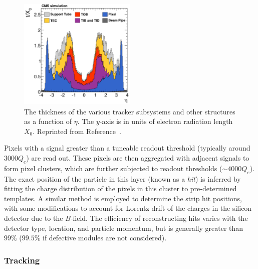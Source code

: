 \begin{figure}[]
    \begin{center} 
        \includegraphics[width=0.5\textwidth]{figures/cms/tracker_material.png}
        \caption{The thickness of the various tracker subsystems and other structures as a function of $\eta$.
				 The $y$-axis is in units of electron radiation length $X_0$.
                 Reprinted from Reference~\cite{cmstracker}.}
        \label{fig:cms:trackermat}
    \end{center}
\end{figure}


Pixels with a signal greater than a tuneable readout threshold (typically around $3000 Q_e$) are read out.
These pixels are then aggregated with adjacent signals to form pixel clusters, which are further subjected to readout thresholds ($\sim 4000 Q_e$).
The exact position of the particle in this layer (known as a \emph{hit}) is inferred by fitting the charge distribution of the pixels in this cluster to pre-determined templates.
A similar method is employed to determine the strip hit positions, with some modifications to account for Lorentz drift of the charges in the silicon detector due to the $B$-field. 
The efficiency of reconstructing hits varies with the detector type, location, and particle momentum, but is generally greater than $99\%$ ($99.5\%$ if defective modules are not considered). 

\subsubsection{Tracking}


